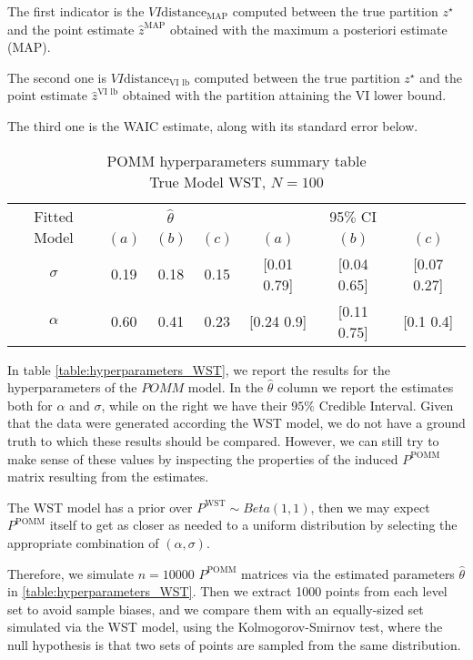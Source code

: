 \documentclass[11pt]{amsart}
\begin{document}
The first indicator is the $VI \text{distance}_{\text{MAP}}$ computed between the true partition $z^\star$ and the point estimate $\hat{z}^{\text{MAP}}$ obtained with the maximum a posteriori estimate (MAP).

The second one is $VI \text{distance}_{\text{VI lb}}$ computed between the true partition $z^\star$ and the point estimate $\hat{z}^{\text{VI lb}}$ obtained with the partition attaining the VI lower bound.

The third one is the WAIC estimate, along with its standard error below.



\begin{table}[htbp]
\centering
\caption{
{\large POMM hyperparameters summary table} \\ 
{\small True Model WST, $N=100$}
} 
\begin{tabular}{ccccccc}
\toprule
\multirow{2}{*}{Fitted Model} & \multicolumn{3}{c}{
$\hat{\theta}$} & \multicolumn{3}{c}{95$\%$ CI} \\
\cmidrule(lr){2-4} \cmidrule(lr){5-7} 
& $(a)$ & $(b)$ & $(c)$ & $(a)$ & $(b)$ & $(c)$  \\
\midrule
$\sigma$  & 0.19 & 0.18 & 0.15 & [0.01	0.79] & [0.04	0.65] & [0.07	0.27]   \\
$\alpha$ & 0.60 & 0.41 & 0.23 & [0.24	0.9] & [0.11	0.75] & [0.1	0.4] \\
\bottomrule
\end{tabular}
\label{table:hyperparameters_WST}
\end{table}


In table \eqref{table:hyperparameters_WST}, we report the results for the hyperparameters of the $POMM$ model. In the $\hat{\theta}$ column we report the estimates both for $\alpha$ and $\sigma$, while on the right we have their $95\%$ Credible Interval.
Given that the data were generated according the WST model, we do not have a ground truth to which these results should be compared. However, we can still try to make sense of these values by inspecting the properties of the induced $P^{\text{POMM}}$ matrix resulting from the estimates.

The WST model has a prior over $P^{\text{WST}} \sim Beta(1,1)$, then we may expect $P^{\text{POMM}}$ itself to get as closer as needed to a uniform distribution by selecting the appropriate combination of $(\alpha, \sigma)$. 

Therefore, we simulate $n=10000$ $P^{\text{POMM}}$ matrices via the estimated parameters $\hat{\theta}$ in \eqref{table:hyperparameters_WST}. Then we extract 1000 points from each level set to avoid sample biases, and we compare them with an equally-sized set simulated via the WST model, using the Kolmogorov-Smirnov test, where the null hypothesis is that two sets of points are sampled from the same distribution.
\end{document}

